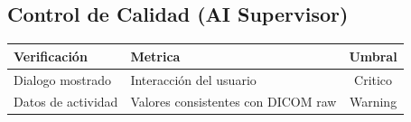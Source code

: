 \documentclass[12pt,a4paper]{article}
\begin{document}
\begin{tcolorbox}[aiSupervisor]
\subsection*{Control de Calidad (AI Supervisor)}

\begin{table}[H]
\centering
\begin{tabular}{llc}
\toprule
\textbf{Verificación} & \textbf{Metrica} & \textbf{Umbral} \\
\midrule
Dialogo mostrado & Interacción del usuario & Critico \\
Datos de actividad & Valores consistentes con DICOM raw & Warning \\
\bottomrule
\end{tabular}
\end{table}

\newpage


\newpage


\newpage


\newpage


\newpage


\newpage


\newpage


\newpage

\end{tcolorbox}
\end{document}
